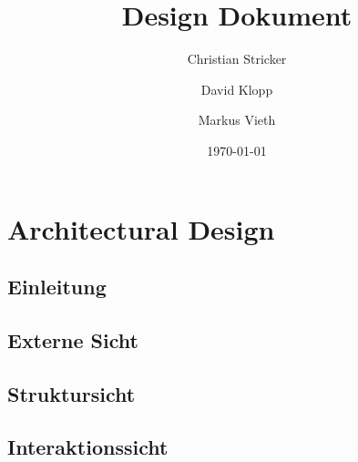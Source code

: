 \documentclass{book}
\title{Design Dokument}
\author{Christian Stricker \and David Klopp \and Markus Vieth}
\date{\today}
\begin{document}
\frontmatter
\maketitle
\tableofcontents
\mainmatter


\part{Architectural Design}

\chapter{Einleitung}

 
\chapter{Externe Sicht}


\chapter{Struktursicht}%
%
 
\chapter{Interaktionssicht}

 
\end{document}
